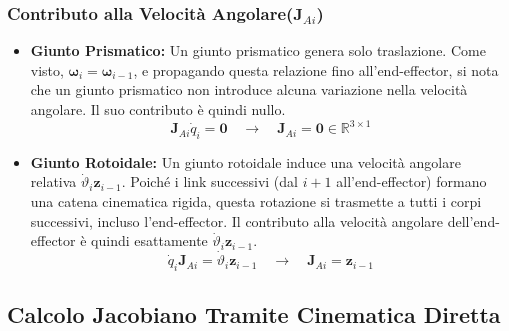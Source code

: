 ﻿\documentclass[11pt, a4paper]{article}
\begin{document}
\subsubsection{Contributo alla Velocità Angolare(\texorpdfstring{$\mathbf{J}_{Ai}$}{J Ai})}
\begin{itemize}
    \item \textbf{Giunto Prismatico:} Un giunto prismatico genera solo traslazione. Come visto, \(\bm{\omega}_i = \bm{\omega}_{i-1}\), e propagando questa relazione fino all'end-effector, si nota che un giunto prismatico non introduce alcuna variazione nella velocità angolare. Il suo contributo è quindi nullo.
    \[
         \bm{J}_{Ai} \dot{q}_i = \bm{0} \quad \longrightarrow \quad \bm{J}_{Ai} = \bm{0} \in \mathbb{R}^{3 \times 1}
    \]

    \item \textbf{Giunto Rotoidale:} Un giunto rotoidale induce una velocità angolare relativa \(\dot{\vartheta}_i \bm{z}_{i-1}\). Poiché i link successivi (dal \(i+1\) all'end-effector) formano una catena cinematica rigida, questa rotazione si trasmette a tutti i corpi successivi, incluso l'end-effector. Il contributo alla velocità angolare dell'end-effector è quindi esattamente \(\dot{\vartheta}_i \bm{z}_{i-1}\).
    \[
        \dot{q}_i \bm{J}_{Ai} = \dot{\vartheta}_i \bm{z}_{i-1} \quad \longrightarrow \quad \bm{J}_{Ai} = \bm{z}_{i-1}
    \]
\end{itemize}
\newpage
\subsection{Calcolo Jacobiano Tramite Cinematica Diretta}
\end{document}
